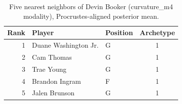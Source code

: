 \begin{table}[htbp]
  \centering\small
  \begin{tabular}{rllc}
    \toprule
    Rank & Player & Position & Archetype \\
    \midrule
    1 & Duane Washington Jr. & G & 1 \\
    2 & Cam Thomas & G & 1 \\
    3 & Trae Young & G & 1 \\
    4 & Brandon Ingram & F & 1 \\
    5 & Jalen Brunson & G & 1 \\
    \bottomrule
  \end{tabular}
  \caption{Five nearest neighbors of Devin Booker (curvature_m4 modality), Procrustes-aligned posterior mean.}
  \label{tab:Devin_Booker_neighbors_curvature_m4}
\end{table}

